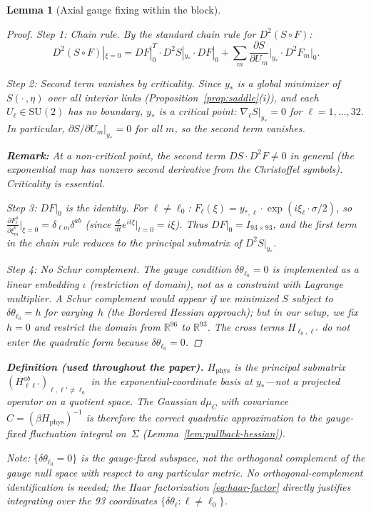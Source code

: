 \documentclass[11pt]{article}
\newtheorem{lemma}[theorem]{Lemma}
\theoremstyle{definition}
\newcommand{\SU}{\mathrm{SU}}
\newcommand{\R}{\mathbb{R}}
\begin{document}
\begin{lemma}[Axial gauge fixing within the block]
\begin{proof}
\emph{Step 1: Chain rule.}
By the standard chain rule for $D^2(S\circ F)$:
\[
D^2(S\circ F)|_{\xi=0}
=DF|_0^T\cdot D^2 S|_{y_*}\cdot DF|_0
+\sum_m\frac{\partial S}{\partial U_m}\bigg|_{y_*}
\cdot D^2 F_m|_0.
\]

\emph{Step 2: Second term vanishes by criticality.}
Since $y_*$ is a global minimizer of $S(\cdot\,,\eta)$ over
all interior links (Proposition~\ref{prop:saddle}(i)), and
each $U_\ell\in\SU(2)$ has no boundary, $y_*$ is a critical
point: $\nabla_\ell S|_{y_*}=0$ for $\ell=1,\ldots,32$.
In particular, $\partial S/\partial U_m|_{y_*}=0$ for all
$m$, so the second term vanishes.

\textbf{Remark:} At a non-critical point, the second term
$DS\cdot D^2 F\ne 0$ in general (the exponential map has
nonzero second derivative from the Christoffel symbols).
Criticality is essential.

\emph{Step 3: $DF|_0$ is the identity.}
For $\ell\ne\ell_0$:
$F_\ell(\xi)=y_{*,\ell}\cdot\exp(i\xi_\ell\cdot\sigma/2)$,
so $\frac{\partial F_\ell^a}{\partial\xi_m^b}\big|_{\xi=0}
=\delta_{\ell m}\delta^{ab}$
(since $\frac{d}{dt}e^{it\xi}|_{t=0}=i\xi$).
Thus $DF|_0=I_{93\times 93}$, and the first term in the
chain rule reduces to the principal submatrix of $D^2 S|_{y_*}$.

\emph{Step 4: No Schur complement.}
The gauge condition
$\delta\theta_{\ell_0}=0$ is implemented as a \emph{linear
embedding} $\iota$ (restriction of domain), not as a constraint with
Lagrange multiplier.
A Schur complement would appear if we minimized $S$ subject
to $\delta\theta_{\ell_0}=h$ for varying~$h$ (the Bordered
Hessian approach); but in our setup, we fix $h=0$ and
restrict the domain from $\R^{96}$ to $\R^{93}$.
The cross terms $H_{\ell_0,\ell'}$ do not enter the
quadratic form because $\delta\theta_{\ell_0}=0$.
\end{proof}

\textbf{Definition (used throughout the paper).}
$H_{\mathrm{phys}}$ is the principal
submatrix $(H_{\ell\ell'}^{ab})_{\ell,\ell'\ne\ell_0}$
in the exponential-coordinate basis at $y_*$---not a projected
operator on a quotient space.
The Gaussian $d\mu_C$ with covariance $C=(\beta H_{\mathrm{phys}})^{-1}$
is therefore the correct quadratic approximation to the gauge-fixed
fluctuation integral on~$\Sigma$
(Lemma~\ref{lem:pullback-hessian}).

Note: $\{\delta\theta_{\ell_0}=0\}$ is the
gauge-fixed subspace, not the orthogonal complement of the
gauge null space with respect to any particular metric.  No
orthogonal-complement identification is needed; the Haar factorization
\eqref{eq:haar-factor} directly justifies integrating over the 93
coordinates $\{\delta\theta_\ell:\ell\ne\ell_0\}$.


\end{lemma}
\end{document}
